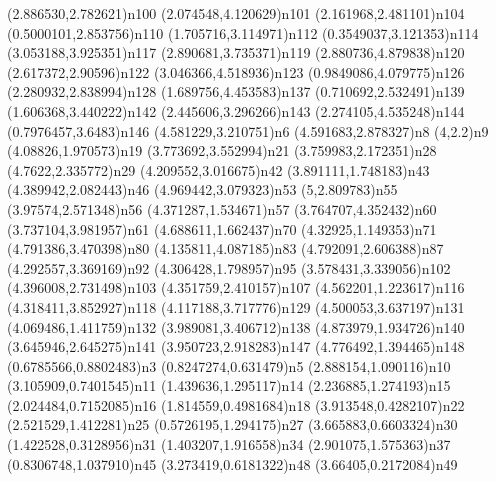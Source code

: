 \dotnode[](2.886530,2.782621){n100}
\dotnode[](2.074548,4.120629){n101}
\dotnode[](2.161968,2.481101){n104}
\dotnode[](0.5000101,2.853756){n110}
\dotnode[](1.705716,3.114971){n112}
\dotnode[](0.3549037,3.121353){n114}
\dotnode[](3.053188,3.925351){n117}
\dotnode[](2.890681,3.735371){n119}
\dotnode[](2.880736,4.879838){n120}
\dotnode[](2.617372,2.90596){n122}
\dotnode[](3.046366,4.518936){n123}
\dotnode[](0.9849086,4.079775){n126}
\dotnode[](2.280932,2.838994){n128}
\dotnode[](1.689756,4.453583){n137}
\dotnode[](0.710692,2.532491){n139}
\dotnode[](1.606368,3.440222){n142}
\dotnode[](2.445606,3.296266){n143}
\dotnode[](2.274105,4.535248){n144}
\dotnode[](0.7976457,3.6483){n146}
\dotnode[](4.581229,3.210751){n6}
\dotnode[](4.591683,2.878327){n8}
\dotnode[](4,2.2){n9}
\dotnode[](4.08826,1.970573){n19}
\dotnode[](3.773692,3.552994){n21}
\dotnode[](3.759983,2.172351){n28}
\dotnode[](4.7622,2.335772){n29}
\dotnode[](4.209552,3.016675){n42}
\dotnode[](3.891111,1.748183){n43}
\dotnode[](4.389942,2.082443){n46}
\dotnode[](4.969442,3.079323){n53}
\dotnode[](5,2.809783){n55}
\dotnode[](3.97574,2.571348){n56}
\dotnode[](4.371287,1.534671){n57}
\dotnode[](3.764707,4.352432){n60}
\dotnode[](3.737104,3.981957){n61}
\dotnode[](4.688611,1.662437){n70}
\dotnode[](4.32925,1.149353){n71}
\dotnode[](4.791386,3.470398){n80}
\dotnode[](4.135811,4.087185){n83}
\dotnode[](4.792091,2.606388){n87}
\dotnode[](4.292557,3.369169){n92}
\dotnode[](4.306428,1.798957){n95}
\dotnode[](3.578431,3.339056){n102}
\dotnode[](4.396008,2.731498){n103}
\dotnode[](4.351759,2.410157){n107}
\dotnode[](4.562201,1.223617){n116}
\dotnode[](4.318411,3.852927){n118}
\dotnode[](4.117188,3.717776){n129}
\dotnode[](4.500053,3.637197){n131}
\dotnode[](4.069486,1.411759){n132}
\dotnode[](3.989081,3.406712){n138}
\dotnode[](4.873979,1.934726){n140}
\dotnode[](3.645946,2.645275){n141}
\dotnode[](3.950723,2.918283){n147}
\dotnode[](4.776492,1.394465){n148}
\dotnode[](0.6785566,0.8802483){n3}
\dotnode[](0.8247274,0.631479){n5}
\dotnode[](2.888154,1.090116){n10}
\dotnode[](3.105909,0.7401545){n11}
\dotnode[](1.439636,1.295117){n14}
\dotnode[](2.236885,1.274193){n15}
\dotnode[](2.024484,0.7152085){n16}
\dotnode[](1.814559,0.4981684){n18}
\dotnode[](3.913548,0.4282107){n22}
\dotnode[](2.521529,1.412281){n25}
\dotnode[](0.5726195,1.294175){n27}
\dotnode[](3.665883,0.6603324){n30}
\dotnode[](1.422528,0.3128956){n31}
\dotnode[](1.403207,1.916558){n34}
\dotnode[](2.901075,1.575363){n37}
\dotnode[](0.8306748,1.037910){n45}
\dotnode[](3.273419,0.6181322){n48}
\dotnode[](3.66405,0.2172084){n49}
